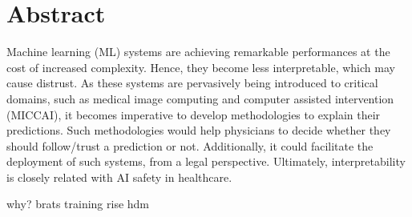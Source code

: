 \chapter*{Abstract}
\label{chap:managementSummary}


Machine learning (ML) systems are achieving remarkable performances at the cost of increased complexity. Hence, they become less interpretable, which may cause distrust. As these systems are pervasively being introduced to critical domains, such as medical image computing and computer assisted intervention (MICCAI), it becomes imperative to develop methodologies to explain their predictions. Such methodologies would help physicians to decide whether they should follow/trust a prediction or not. Additionally, it could facilitate the deployment of such systems, from a legal perspective. Ultimately, interpretability is closely related with AI safety in healthcare.



 


 




why?
brats training
rise
hdm